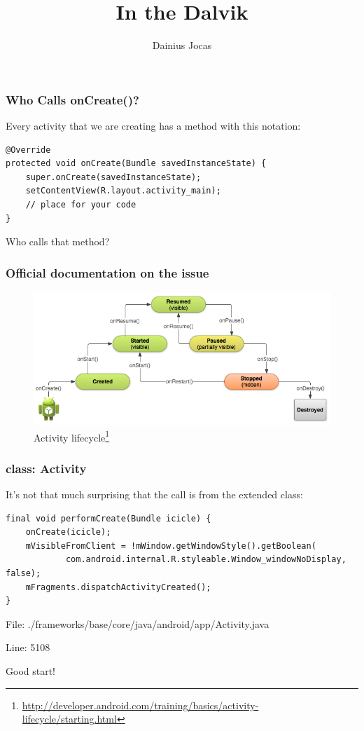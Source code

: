 \documentclass[11pt,a4paper]{beamer}
\author{Dainius Jocas}
\title{In the Dalvik}
\begin{document}
\frame{\titlepage} 

\begin{frame}[fragile]
\frametitle{Who Calls onCreate()?}

Every activity that we are creating has a method with this notation:
\scriptsize\begin{verbatim}
@Override
protected void onCreate(Bundle savedInstanceState) {
    super.onCreate(savedInstanceState);
    setContentView(R.layout.activity_main);
    // place for your code
}
\end{verbatim} 
\normalsize
Who calls that method?

\end{frame}

\begin{frame}[fragile]
\frametitle{Official documentation on the issue}
\begin{figure}
  \center
  \includegraphics[width=\textwidth]{./images/basiclifecycle.png}
  \caption{Activity lifecycle\footnote{\url{http://developer.android.com/training/basics/activity-lifecycle/starting.html}}}
\end{figure} 
\end{frame}

\begin{frame}[fragile]
\frametitle{class: Activity}

It's not that much surprising that the call is from the extended class:
\scriptsize\begin{verbatim}
final void performCreate(Bundle icicle) {
    onCreate(icicle);
    mVisibleFromClient = !mWindow.getWindowStyle().getBoolean(
            com.android.internal.R.styleable.Window_windowNoDisplay, false);
    mFragments.dispatchActivityCreated();
}
\end{verbatim}
\normalsize

File: ./frameworks/base/core/java/android/app/Activity.java

Line: 5108

Good start!

\end{frame}
\end{document}
